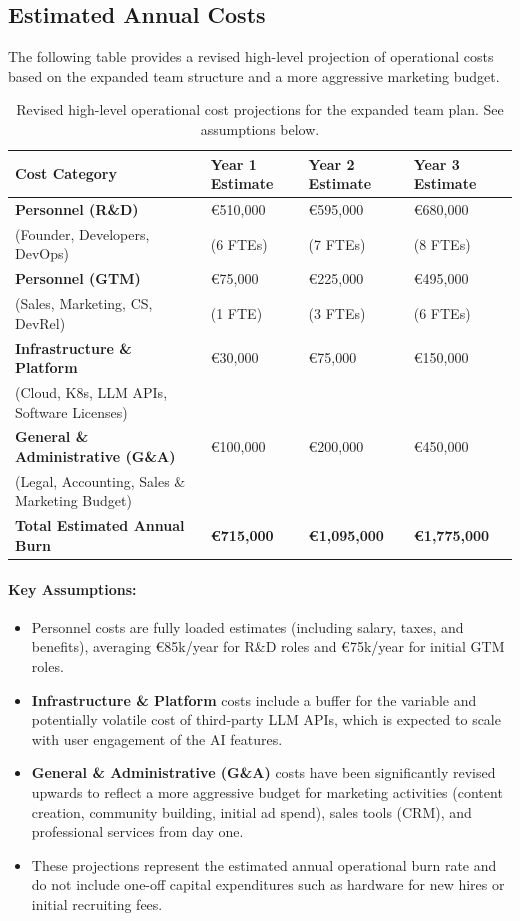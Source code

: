 \documentclass[11pt, a4paper, oneside]{article}
\begin{document}
\subsection*{Estimated Annual Costs}
The following table provides a revised high-level projection of operational costs based on the expanded team structure and a more aggressive marketing budget.

\begin{table}[H]
\centering
\begin{tabularx}{\textwidth}{L L L L}
\toprule
\textbf{Cost Category} & \textbf{Year 1 Estimate} & \textbf{Year 2 Estimate} & \textbf{Year 3 Estimate} \\
\midrule
\textbf{Personnel (R\&D)} & €510,000 & €595,000 & €680,000 \\
(Founder, Developers, DevOps) & (6 FTEs) & (7 FTEs) & (8 FTEs) \\
\addlinespace
\textbf{Personnel (GTM)} & €75,000 & €225,000 & €495,000 \\
(Sales, Marketing, CS, DevRel) & (1 FTE) & (3 FTEs) & (6 FTEs) \\
\addlinespace
\textbf{Infrastructure \& Platform} & €30,000 & €75,000 & €150,000 \\
(Cloud, K8s, LLM APIs, Software Licenses) & & & \\
\addlinespace
\textbf{General \& Administrative (G\&A)} & €100,000 & €200,000 & €450,000 \\
(Legal, Accounting, Sales \& Marketing Budget) & & & \\
\midrule
\textbf{Total Estimated Annual Burn} & \textbf{€715,000} & \textbf{€1,095,000} & \textbf{€1,775,000} \\
\bottomrule
\end{tabularx}
\caption{Revised high-level operational cost projections for the expanded team plan. See assumptions below.}
\label{tab:cost_projections_expanded_team}
\end{table}

\paragraph*{Key Assumptions:}
\begin{itemize}
    \item Personnel costs are fully loaded estimates (including salary, taxes, and benefits), averaging €85k/year for R\&D roles and €75k/year for initial GTM roles.
    \item \textbf{Infrastructure \& Platform} costs include a buffer for the variable and potentially volatile cost of third-party LLM APIs, which is expected to scale with user engagement of the AI features.
    \item \textbf{General \& Administrative (G\&A)} costs have been significantly revised upwards to reflect a more aggressive budget for marketing activities (content creation, community building, initial ad spend), sales tools (CRM), and professional services from day one.
    \item These projections represent the estimated annual operational burn rate and do not include one-off capital expenditures such as hardware for new hires or initial recruiting fees.
\end{itemize}
\end{document}
